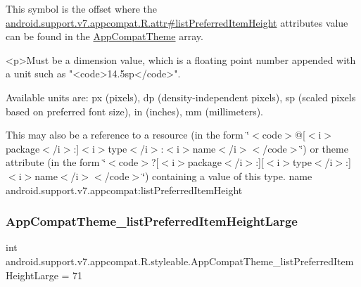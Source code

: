 This symbol is the offset where the \hyperlink{classandroid_1_1support_1_1v7_1_1appcompat_1_1R_1_1attr_a054ea1bd82a17a4a8f87815b99a973dd}{android.\+support.\+v7.\+appcompat.\+R.\+attr\#list\+Preferred\+Item\+Height} attribute\textquotesingle{}s value can be found in the \hyperlink{classandroid_1_1support_1_1v7_1_1appcompat_1_1R_1_1styleable_a5c42f89e8a410c323be34208d75c430b}{App\+Compat\+Theme} array.

\begin{DoxyVerb}      <p>Must be a dimension value, which is a floating point number appended with a unit such as "<code>14.5sp</code>".
\end{DoxyVerb}
 Available units are\+: px (pixels), dp (density-\/independent pixels), sp (scaled pixels based on preferred font size), in (inches), mm (millimeters). 

This may also be a reference to a resource (in the form \char`\"{}$<$code$>$@\mbox{[}$<$i$>$package$<$/i$>$\+:\mbox{]}$<$i$>$type$<$/i$>$\+:$<$i$>$name$<$/i$>$$<$/code$>$\char`\"{}) or theme attribute (in the form \char`\"{}$<$code$>$?\mbox{[}$<$i$>$package$<$/i$>$\+:\mbox{]}\mbox{[}$<$i$>$type$<$/i$>$\+:\mbox{]}$<$i$>$name$<$/i$>$$<$/code$>$\char`\"{}) containing a value of this type.  name android.\+support.\+v7.\+appcompat\+:list\+Preferred\+Item\+Height \mbox{\label{classandroid_1_1support_1_1v7_1_1appcompat_1_1R_1_1styleable_aeb22f3a67066dc3fc32649e2528521f9}} 
\subsubsection{\texorpdfstring{App\+Compat\+Theme\+\_\+list\+Preferred\+Item\+Height\+Large}{AppCompatTheme\_listPreferredItemHeightLarge}}
{\footnotesize\ttfamily int android.\+support.\+v7.\+appcompat.\+R.\+styleable.\+App\+Compat\+Theme\+\_\+list\+Preferred\+Item\+Height\+Large = 71\hspace{0.3cm}{\ttfamily [static]}}

